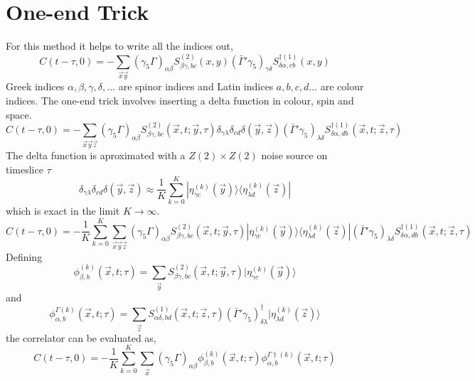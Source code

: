 \documentclass[3p,preprint]{elsarticle}
\begin{document}
\section{One-end Trick}
For this method it helps to write all the indices out,
\begin{equation}
C(t - \tau, 0) = -\sum_{\vec{x} \vec{y}} (\gamma_5 \Gamma)_{\alpha \beta} S^{(2)}_{\beta\gamma,bc} (x,y) (\bar{ \Gamma }' \gamma_5)_{\gamma \delta} S^{\dagger (1)}_{\delta \alpha, cb} (x,y)
\end{equation}
Greek indices $\alpha, \beta, \gamma, \delta, ...$ are spinor indices and Latin indices $a, b, c, d...$ are colour indices.
The one-end trick involves inserting a delta function in colour, spin and space.
\begin{equation}
C(t - \tau, 0) = -\sum_{\vec{x} \vec{y} \vec{z}} (\gamma_5 \Gamma)_{\alpha \beta} S^{(2)}_{\beta\gamma,b c} (\vec{x}, t; \vec{y}, \tau) \delta_{\gamma \lambda} \delta_{cd} \delta(\vec{y}, \vec{z}) (\bar{ \Gamma }' \gamma_5)_{\lambda \delta} S^{\dagger (1)}_{\delta \alpha, d b} (\vec{x}, t;\vec{z}, \tau)
\end{equation}
The delta function is aproximated with a $Z(2) \times Z(2)$ noise source on timeslice $\tau$
\begin{equation}
\delta_{\gamma \lambda} \delta_{cd} \delta(\vec{y}, \vec{z}) \approx \frac{1}{K} \sum_{k = 0}^{K} | \eta^{(k)}_{\gamma c }(\vec{y})\rangle \langle \eta^{(k)}_{\lambda d }(\vec{z}) |
\end{equation}
which is exact in the limit $K \rightarrow \infty$.
\begin{equation}\label{eqn:oet}
C(t - \tau, 0) = -\frac{1}{K} \sum_{k = 0}^{K} \sum_{\vec{x} \vec{y} \vec{z}} (\gamma_5 \Gamma)_{\alpha \beta} S^{(2)}_{\beta\gamma,b c} (\vec{x}, t; \vec{y}, \tau) | \eta^{(k)}_{\gamma c }(\vec{y})\rangle \langle \eta^{(k)}_{\lambda d }(\vec{z}) | (\bar{ \Gamma }' \gamma_5)_{\lambda \delta} S^{\dagger (1)}_{\delta \alpha, d b} (\vec{x}, t;\vec{z}, \tau)
\end{equation}
Defining
\begin{equation}
\phi^{(k)}_{\beta, b}(\vec{x}, t; \tau) = \sum_{\vec{y}} S^{(2)}_{\beta\gamma,b c} (\vec{x}, t; \vec{y}, \tau) | \eta^{(k)}_{\gamma c }(\vec{y})\rangle
\end{equation}
and
\begin{equation}
\phi^{\Gamma (k)}_{\alpha, b}(\vec{x}, t; \tau) = \sum_{\vec{z}} S^{(1)}_{\alpha \delta , b d} (\vec{x}, t;\vec{z}, \tau) (\bar{ \Gamma }' \gamma_5)^{\dagger}_{\delta \lambda} | \eta^{(k)}_{\lambda d }(\vec{z}) \rangle
\end{equation}
the correlator can be evaluated as,
\begin{equation}
C(t - \tau, 0) = -\frac{1}{K} \sum_{k = 0}^{K} \sum_{\vec{x} } (\gamma_5 \Gamma)_{\alpha \beta} \phi^{(k)}_{\beta, b}(\vec{x}, t; \tau) \phi^{\Gamma \dagger (k)}_{\alpha, b}(\vec{x}, t; \tau)
\end{equation}
\end{document}
